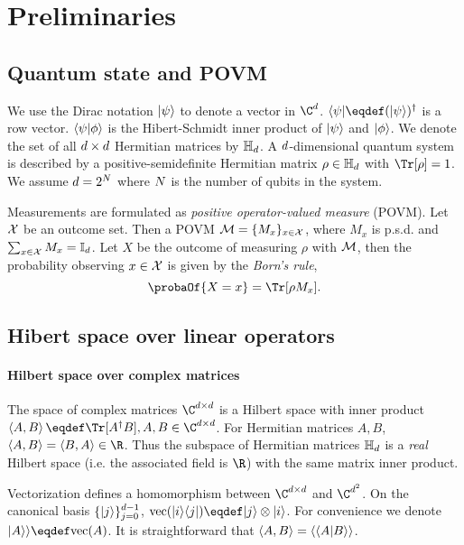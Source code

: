 \section{Preliminaries}
\subsection{Quantum state and POVM}
We use the Dirac notation $|{\psi}\rangle$ to denote a vector in $\C^{\dims}$. $\qadjoint{\psi}\eqdef(\qbit{\psi})^\dagger$ is a row vector. $\langle\psi|\phi\rangle$ is the Hibert-Schmidt inner product of $|{\psi}\rangle$ and $|{\phi}\rangle$. We denote the set of all $d\times d$ Hermitian matrices by ${\mathbb{H}_{d}}$. A $d$-dimensional quantum system is described by a positive-semidefinite Hermitian matrix $\rho\in{\mathbb{H}_{d}}$ with $\Tr[\rho]=1$. We assume $d=2^{{N}}$ where ${N}$ is the number of qubits in the system.

Measurements are formulated as \emph{positive operator-valued measure} (POVM). Let ${\mathcal{X}}$ be an outcome set. Then a POVM $\mathcal{M}=\{M_x\}_{x\in {\mathcal{X}}}$, where $M_x$ is p.s.d. and $\sum_{x\in {\mathcal{X}}}M_x=\mathbb{I}_d$. Let $X$ be the outcome of measuring $\rho$ with $\mathcal{M}$, then the probability observing $x\in{\mathcal{X}}$ is given by the \emph{Born's rule},
\[
\probaOf{X=x}=\Tr[\rho M_x].
\]
\subsection{Hibert space over linear operators}

\paragraph{Hilbert space over complex matrices}
The space of complex matrices $\C^{\dims\times\dims}$ is a Hilbert space with inner product $\hdotprod{A}{B}\eqdef\Tr[A^\dagger B], A, B\in \C^{\dims\times \dims}$. For Hermitian matrices $A,B$, $\hdotprod{A}{B}=\hdotprod{B}{A}\in \R$. Thus the subspace of Hermitian matrices ${\mathbb{H}_{d}}$ is a \textit{real} Hilbert space (i.e. the associated field is $\R$) with the same matrix inner product. 

Vectorization defines a homomorphism between $\C^{\dims\times\dims}$ and $\C^{\dims^2}$. 
On the canonical basis $\{|{j}\rangle\}_{j=0}^{d-1}$, $\VecOp(\qoutprod{i}{j})\eqdef \qbit{j}\otimes \qbit{i}$. For convenience we denote $\vvec{A}\eqdef\VecOp(A)$. It is straightforward that $\left\langle A,B\right\rangle=\left\langle\left\langle A|B\right\rangle\right\rangle$. 


